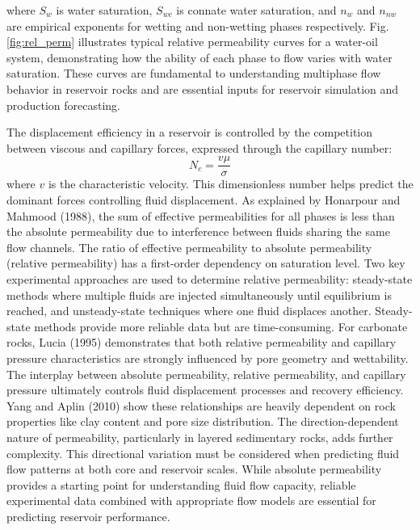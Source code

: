 \documentclass[journal]{IEEEtran}
\begin{document}
where $S_w$ is water saturation, $S_{wc}$ is connate water saturation, and $n_w$ and $n_{nw}$ are empirical exponents for wetting and non-wetting phases respectively. Fig. \ref{fig:rel_perm} illustrates typical relative permeability curves for a water-oil system, demonstrating how the ability of each phase to flow varies with water saturation. These curves are fundamental to understanding multiphase flow behavior in reservoir rocks and are essential inputs for reservoir simulation and production forecasting.

The displacement efficiency in a reservoir is controlled by the competition between viscous and capillary forces, expressed through the capillary number:
\begin{equation}
N_c = \frac{v\mu}{\sigma}
\end{equation}
where $v$ is the characteristic velocity. This dimensionless number helps predict the dominant forces controlling fluid displacement.
As explained by Honarpour and Mahmood (1988)\parencite{honarpour_relative-permeability_1988}, the sum of effective permeabilities for all phases is less than the absolute permeability due to interference between fluids sharing the same flow channels. The ratio of effective permeability to absolute permeability (relative permeability) has a first-order dependency on saturation level.
Two key experimental approaches are used to determine relative permeability: steady-state methods where multiple fluids are injected simultaneously until equilibrium is reached, and unsteady-state techniques where one fluid displaces another. Steady-state methods provide more reliable data but are time-consuming.
For carbonate rocks, Lucia (1995)\parencite{f_jerry_lucia_2_rock-fabricpetrophysical_1995} demonstrates that both relative permeability and capillary pressure characteristics are strongly influenced by pore geometry and wettability. The interplay between absolute permeability, relative permeability, and capillary pressure ultimately controls fluid displacement processes and recovery efficiency. Yang and Aplin (2010)\parencite{yang_permeabilityporosity_2010} show these relationships are heavily dependent on rock properties like clay content and pore size distribution.
The direction-dependent nature of permeability, particularly in layered sedimentary rocks, adds further complexity. This directional variation must be considered when predicting fluid flow patterns at both core and reservoir scales. While absolute permeability provides a starting point for understanding fluid flow capacity, reliable experimental data combined with appropriate flow models are essential for predicting reservoir performance.
\end{document}
